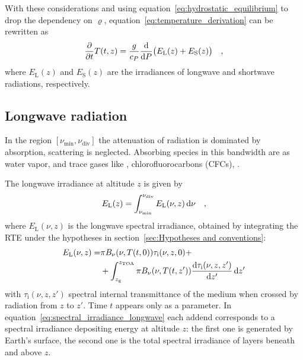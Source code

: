 \documentclass[a4paper,10pt,twocolumn,\classoptions]{article}
\newcommand{\zTOA}{z_\text{TOA}}
\begin{document}
With these considerations and using equation~\eqref{eq:hydrostatic_equilibrium} to drop the dependency on $\varrho$, equation~\eqref{eq:temperature_derivation} can be rewritten as
\begin{equation}
  \label{eq:temperature_time_derivative}
  \pdv*{T(t,z)}{t} = \frac{g}{c_P} \odv*{\big( E_\text{L}(z) + E_\text{S}(z) \big)}{P}
  \quad ,
\end{equation}
where $E_\text{L}(z)$ and $E_\text{S}(z)$ are the irradiances of longwave and shortwave radiations, respectively.



\subsection{Longwave radiation}
\label{sec:Longwave radiation}
In the region $[\nu_\text{min}, \nu_\text{div}]$ the attenuation of radiation is dominated by absorption, scattering is neglected.
Absorbing species in this bandwidth are  as water vapor,  and trace gases like , chlorofluorocarbons (CFCs), .

The longwave irradiance at altitude $z$ is given by
\begin{equation}
  \label{eq:irradiance_longwave}
  E_\text{L}(z) = \int_{\nu_\text{min}}^{\nu_\text{div}} E_\text{L}(\nu, z) \odif{\nu}
  \quad ,
\end{equation}
where $E_\text{L}(\nu, z)$ is the longwave spectral irradiance, obtained by integrating the RTE under the hypotheses in section~\ref{sec:Hypotheses and conventions}:
\begin{equation}
  \label{eq:spectral_irradiance_longwave}
  \begin{split}
    E_\text{L}(\nu, z) = & \pi B_\nu(\nu, T(t, 0)) \tau_\text{i}(\nu, z, 0) + \\
    & + \int_{z_\text{g}}^{\zTOA} \pi B_\nu(\nu, T(t, z')) \odv{\tau_\text{i}(\nu, z, z')}{z'} \odif{z'}
  \end{split}
\end{equation}
with $\tau_\text{i}(\nu, z, z')$ spectral internal transmittance of the medium when crossed by radiation from $z$ to $z'$. Time $t$ appears only as a parameter.
In equation~\eqref{eq:spectral_irradiance_longwave} each addend corresponds to a spectral irradiance depositing energy at altitude $z$: the first one is generated by Earth's surface, the second one is the total spectral irradiance of layers beneath and above $z$.
\end{document}
